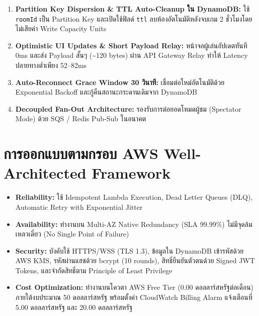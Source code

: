 \documentclass[12pt,a4paper]{report}
\begin{document}
\begin{enumerate}
    \item \textbf{Partition Key Dispersion \& TTL Auto-Cleanup ใน DynamoDB:} ใช้ \texttt{roomId} เป็น Partition Key และเปิดใช้ฟิลด์ \texttt{ttl} ลบห้องอัตโนมัติหลังจบเกม 2 ชั่วโมงโดยไม่เสียค่า Write Capacity Units
    \item \textbf{Optimistic UI Updates \& Short Payload Relay:} หน้าจอผู้เล่นอัปเดตทันที 0ms และส่ง Payload สั้นๆ (\textasciitilde 120 bytes) ผ่าน API Gateway Relay ทำให้ Latency ปลายทางต่ำเพียง 52--82ms
    \item \textbf{Auto-Reconnect Grace Window 30 วินาที:} เชื่อมต่อใหม่อัตโนมัติด้วย Exponential Backoff และกู้คืนสถานะกระดานเดิมจาก DynamoDB
    \item \textbf{Decoupled Fan-Out Architecture:} รองรับการต่อยอดโหมดผู้ชม (Spectator Mode) ด้วย SQS / Redis Pub-Sub ในอนาคต
\end{enumerate}

\section{การออกแบบตามกรอบ AWS Well-Architected Framework}
\begin{itemize}
    \item \textbf{Reliability:} ใช้ Idempotent Lambda Execution, Dead Letter Queues (DLQ), Automatic Retry with Exponential Jitter
    \item \textbf{Availability:} ทำงานบน Multi-AZ Native Redundancy (SLA 99.99\%) ไม่มีจุดล้มเหลวเดี่ยว (No Single Point of Failure)
    \item \textbf{Security:} บังคับใช้ HTTPS/WSS (TLS 1.3), ข้อมูลใน DynamoDB เข้ารหัสด้วย AWS KMS, รหัสผ่านแฮชด้วย bcrypt (10 rounds), สิทธิ์ยืนยันตัวตนด้วย Signed JWT Tokens, และจำกัดสิทธิ์ตาม Principle of Least Privilege
    \item \textbf{Cost Optimization:} ทำงานบนโควตา AWS Free Tier (0.00 ดอลลาร์สหรัฐต่อเดือน) ภายใต้งบประมาณ 50 ดอลลาร์สหรัฐ พร้อมตั้งค่า CloudWatch Billing Alarm แจ้งเตือนที่ 5.00 ดอลลาร์สหรัฐ และ 20.00 ดอลลาร์สหรัฐ
\end{itemize}
\end{document}
